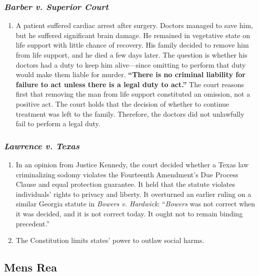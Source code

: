 \subsubsection{\emph{Barber v. Superior Court}}

\begin{enumerate}
    \item A patient suffered cardiac arrest after surgery. Doctors managed to save him, but he suffered significant brain damage. He remained in vegetative state on life support with little chance of recovery. His family decided to remove him from life support, and he died a few days later. The question is whether his doctors had a duty to keep him alive---since omitting to perform that duty would make them liable for murder. \textbf{``There is no criminal liability for failure to act unless there is a legal duty to act.''} The court reasons first that removing the man from life support constituted an omission, not a positive act. The court holds that the decision of whether to continue treatment was left to the family. Therefore, the doctors did not unlawfully fail to perform a legal duty.
\end{enumerate}

\subsubsection{\emph{Lawrence v. Texas}}

\begin{enumerate}
    \item In an opinion from Justice Kennedy, the court decided whether a Texas law criminalizing sodomy violates the Fourteenth Amendment's Due Process Clause and equal protection guarantee. It held that the statute violates individuals' rights to privacy and liberty. It overturned an earlier ruling on a similar Georgia statute in \emph{Bowers v. Hardwick}: ``\emph{Bowers} was not correct when it was decided, and it is not correct today. It ought not to remain binding precedent.''
    \item The Constitution limits states' power to outlaw social harms.
\end{enumerate}

\subsection{Mens Rea}

